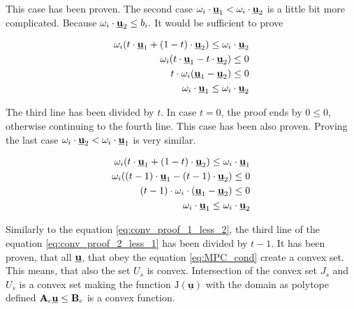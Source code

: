 \documentclass{article}
\begin{document}
This case has been proven. The second case $\omega_i \cdot \textbf{\underline{u}}_1 < \omega_i \cdot \textbf{\underline{u}}_2$ is a little bit more complicated. Because $\omega_i \cdot \textbf{\underline{u}}_2 \leq b_i.$ It would be sufficient to prove 

\begin{equation}
\label{eq:conv_proof_1_less_2}
\begin{split}
\omega_i(t \cdot \textbf{\underline{u}}_1 + (1-t) \cdot \textbf{\underline{u}}_2) \leq \omega_i \cdot \textbf{\underline{u}}_2\\
\omega_i(t \cdot \textbf{\underline{u}}_1 -t \cdot \textbf{\underline{u}}_2) \leq 0\\
t \cdot \omega_i(\textbf{\underline{u}}_1 - \textbf{\underline{u}}_2) \leq 0\\
\omega_i \cdot \textbf{\underline{u}}_1 \leq \omega_i \cdot \textbf{\underline{u}}_2
\end{split}
\end{equation}

The third line has been divided by $t$. In case $t = 0$, the proof ends by $0 \leq 0$, otherwise continuing to the fourth line. This case has been also proven. Proving the last case $\omega_i \cdot \textbf{\underline{u}}_2 < \omega_i \cdot \textbf{\underline{u}}_1$ is very similar. 

\begin{equation}
\label{eq:conv_proof_2_less_1}
\begin{split}
\omega_i(t \cdot \textbf{\underline{u}}_1 + (1-t) \cdot \textbf{\underline{u}}_2) \leq \omega_i \cdot \textbf{\underline{u}}_1\\
\omega_i((t - 1) \cdot \textbf{\underline{u}}_1 - (t - 1) \cdot \textbf{\underline{u}}_2) \leq 0 \\
(t - 1) \cdot \omega_i \cdot (\textbf{\underline{u}}_1 - \textbf{\underline{u}}_2) \leq 0 \\
\omega_i \cdot \textbf{\underline{u}}_1 \leq \omega_i \cdot \textbf{\underline{u}}_2
\end{split}
\end{equation}

Similarly to the equation \ref{eq:conv_proof_1_less_2}, the third line of the equation \ref{eq:conv_proof_2_less_1} has been divided by $t-1$. 
It has been proven, that all $\textbf{\underline{u}}$, that obey the equation \ref{eq:MPC_cond} create a convex set. This means, that also the set $U_s$ is convex. Intersection of the convex set $J_s$ and $U_s$ is a convex set making the function $\mathrm{J}(\underline{\textbf{u}})$ with the domain as polytope defined $\textbf{A}_c \textbf{\underline{u}} \leq \textbf{B}_c$ is a convex function.
\end{document}
